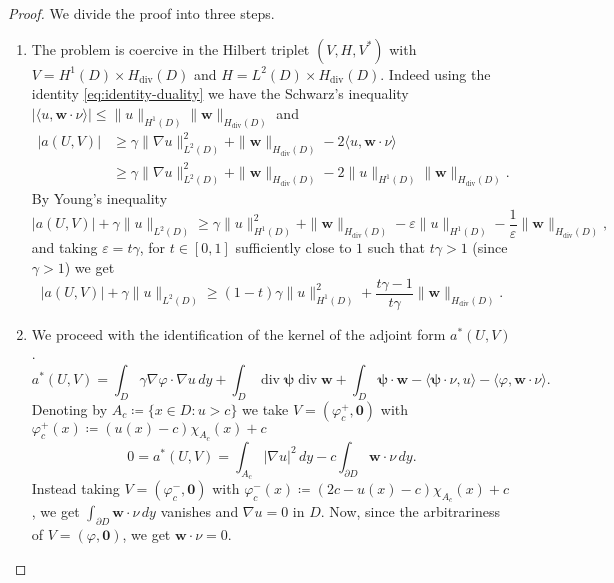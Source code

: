\documentclass[10pt, a4paper, twoside, openright]{book}
\theoremstyle{definition}
\theoremstyle{plain}
\theoremstyle{plain}
\theoremstyle{plain}
\theoremstyle{plain}
\theoremstyle{plain}
\theoremstyle{plain}
\theoremstyle{plain}
\theoremstyle{plain}
\DeclareMathOperator{\divergence}{div}
\let\phi\varphi
\let\epsilon\varepsilon
\begin{document}
\begin{proof}
We divide the proof into three steps.
 \begin{enumerate}
 \item 
 The problem is coercive in the Hilbert triplet $(V,H,V^*)$ with $V=H^1(D)\times H_{\divergence}(D)$ and $H=L^2(D)\times H_{\divergence}(D)$.
 Indeed using the identity \eqref{eq:identity-duality} we have the Schwarz's inequality $|\langle u ,\bm{w}\cdot\nu\rangle |\leq\|u\|_{H^1(D)}\|\bm{w}\|_{H_{\divergence}(D)}$ and
\begin{align}
 |a(U,V)|&\geq \gamma\|\nabla u\|_{L^2(D)}^2 + \|\bm{w}\|_{H_{\divergence}(D)}-2\langle u ,\bm{w}\cdot\nu\rangle \\
 &\geq \gamma\|\nabla u\|_{L^2(D)}^2 + \|\bm{w}\|_{H_{\divergence}(D)}-2\|u\|_{H^1(D)}\|\bm{w}\|_{H_{\divergence}(D)}.
 \end{align}
 By Young's inequality
 \begin{equation}
 |a(U,V)| + \gamma\|u\|_{L^2(D)} \geq \gamma\|u\|_{H^1(D)}^2 + \|\bm{w}\|_{H_{\divergence}(D)}-\epsilon\|u\|_{H^1(D)} - \frac{1}{\epsilon}\|\bm{w}\|_{H_{\divergence}(D)},
 \end{equation}
 and taking $\epsilon=t\gamma$, for $t\in[0,1]$ sufficiently close to $1$ such that $t\gamma>1$ (since $\gamma>1$) we get
 \begin{equation}
  |a(U,V)| + \gamma\|u\|_{L^2(D)}\geq (1-t)\gamma\|u\|_{H^1(D)}^2 + \frac{t\gamma - 1}{t\gamma}\|\bm{w}\|_{H_{\divergence}(D)}.
 \end{equation}
 \item We proceed with the identification of the kernel of the adjoint form $a^*(U,V)$.
\begin{equation*}
  a^*(U,V)= \int_D \gamma \nabla \phi \cdot\nabla u\,dy + \int_D\divergence \bm{\psi}\divergence\bm{w} + \int_D\bm{\psi}\cdot\bm{w} - \langle \bm{\psi}\cdot\nu, u \rangle- \langle \phi,\bm{w}\cdot\nu\rangle.
\end{equation*}
 Denoting by $A_c\coloneqq\{x\in D: u>c\}$ we take $V=(\phi_c^+, \bm{0})$ with $\phi_c^+(x)\coloneqq (u(x)-c)\chi_{A_c}(x) + c$
\begin{equation*}
  0 = a^*(U,V)= \int_{A_c} |\nabla u|^2\,dy - c\int_{\partial D}\bm{w}\cdot\nu\, dy.
\end{equation*}
 Instead taking $V=(\phi_c^-,\bm{0})$ with $\phi_c^-(x)\coloneqq (2c - u(x) - c)\chi_{A_c}(x) + c$, we get 
 $\int_{\partial D}\bm{w}\cdot\nu\,dy$ vanishes and $\nabla u=0$ in $D$. 
 Now, since the arbitrariness of $V=(\phi, \bm 0)$, we get $\bm{w}\cdot\nu =0$.

\end{enumerate}
\end{proof}
\end{document}
